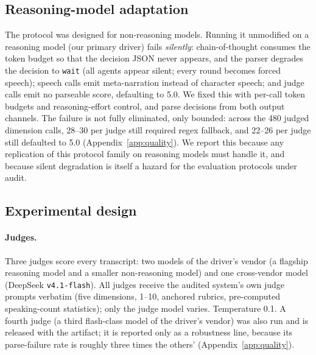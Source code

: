 \subsection{Reasoning-model adaptation}

The protocol was designed for non-reasoning models. Running it
unmodified on a reasoning model (our primary driver) fails
\emph{silently}: chain-of-thought consumes the token budget so that the
decision JSON never appears, and the parser degrades the decision to
\texttt{wait} (all agents appear silent; every round becomes forced
speech); speech calls emit meta-narration instead of character speech;
and judge calls emit no parseable score, defaulting to 5.0. We fixed
this with per-call token budgets and reasoning-effort control, and parse
decisions from both output channels. The failure is not fully eliminated,
only bounded: across the 480 judged dimension calls, 28--30 per judge
still required regex fallback, and 22--26 per judge still defaulted to
5.0 (Appendix~\ref{app:quality}). We report this because any
replication of this protocol family on reasoning models must handle it,
and because silent degradation is itself a hazard for the evaluation
protocols under audit.

\subsection{Experimental design}

\paragraph{Judges.} Three judges score every transcript: two models of
the driver's vendor (a flagship reasoning model and a smaller
non-reasoning model) and one cross-vendor model (DeepSeek
\texttt{v4.1-flash}). All judges receive the audited system's own judge
prompts verbatim (five dimensions, 1--10, anchored rubrics,
pre-computed speaking-count statistics); only the judge model varies.
Temperature 0.1. A fourth judge (a third flash-class model of the
driver's vendor) was also run and is released with the artifact; it is
reported only as a robustness line, because its parse-failure rate is
roughly three times the others' (Appendix~\ref{app:quality}).

